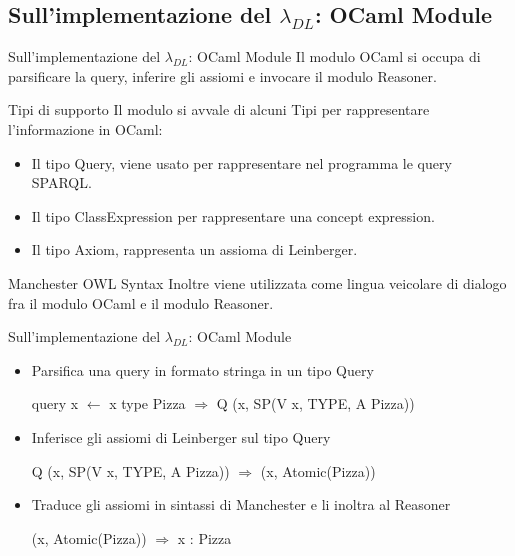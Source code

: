 \subsection{Sull'implementazione del $\lambda_{DL}$: OCaml Module}
\begin{frame}{Sull'implementazione del $\lambda_{DL}$: OCaml Module}
    Il modulo OCaml si occupa di parsificare la query, inferire gli assiomi e invocare il modulo Reasoner.
    \begin{block}{Tipi di supporto}
        Il modulo si avvale di alcuni Tipi per rappresentare l'informazione in OCaml:
        \begin{itemize}
            \item Il tipo Query, viene usato per rappresentare nel programma le query SPARQL.
            \item Il tipo ClassExpression per rappresentare una concept expression.
            \item Il tipo Axiom, rappresenta un assioma di Leinberger. 
        \end{itemize}
    \end{block}
    \begin{block}{Manchester OWL Syntax}
    Inoltre viene utilizzata come lingua veicolare di dialogo fra il modulo OCaml e il modulo Reasoner.
    \end{block}
\end{frame}

\begin{frame}{Sull'implementazione del $\lambda_{DL}$: OCaml Module}

    \begin{itemize}
        \item Parsifica una query in formato stringa in un tipo Query
        \begin{example}
            query x $\leftarrow$ x type Pizza $\Rightarrow$
            Q (x, SP(V x, TYPE, A Pizza))
        \end{example}
        \item Inferisce gli assiomi di Leinberger sul tipo Query
        \begin{example}
            Q (x, SP(V x, TYPE, A Pizza))
            $\Rightarrow$ 
            (x, Atomic(Pizza))
        \end{example}
        \item Traduce gli assiomi in sintassi di Manchester e li inoltra al Reasoner
        \begin{example}
            (x, Atomic(Pizza))
            $\Rightarrow$ 
            x : Pizza
        \end{example}
    \end{itemize}
\end{frame}

